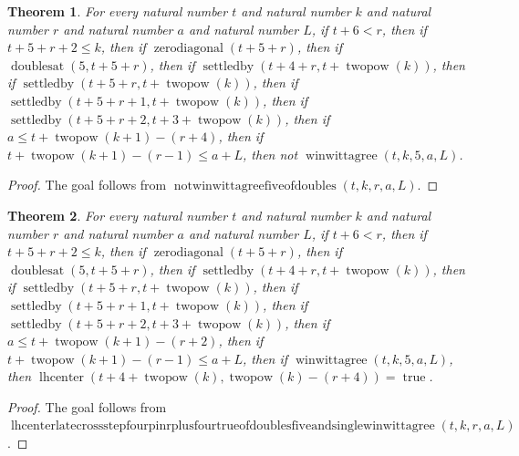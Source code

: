 \documentclass[11pt]{article}
\newtheorem{theorem}{Theorem}[section]
\theoremstyle{definition}
\begin{document}
\begin{theorem}
\label{ll:paper:not-winwittagree-five-of-doubles}
For every natural number \(t\) and natural number \(k\) and natural number \(r\) and natural number \(a\) and natural number \(L\), if \(t + 6 < r\), then if \(t + 5 + r + 2 \le k\), then if \(\operatorname{zerodiagonal}(t + 5 + r)\), then if \(\operatorname{doublesat}(5, t + 5 + r)\), then if \(\operatorname{settledby}(t + 4 + r, t + \operatorname{twopow}(k))\), then if \(\operatorname{settledby}(t + 5 + r, t + \operatorname{twopow}(k))\), then if \(\operatorname{settledby}(t + 5 + r + 1, t + \operatorname{twopow}(k))\), then if \(\operatorname{settledby}(t + 5 + r + 2, t + 3 + \operatorname{twopow}(k))\), then if \(a \le t + \operatorname{twopow}(k + 1) - (r + 4)\), then if \(t + \operatorname{twopow}(k + 1) - (r - 1) \le a + L\), then not \(\operatorname{winwittagree}(t, k, 5, a, L)\).
\end{theorem}
\begin{proof}
The goal follows from \(\operatorname{notwinwittagreefiveofdoubles}(t, k, r, a, L)\).
\end{proof}
\begin{theorem}
\label{ll:paper:lhcenter-late-cross-step-four-pin-r-plus-four-true-of-doubles-five-and-single-winwittagree}
For every natural number \(t\) and natural number \(k\) and natural number \(r\) and natural number \(a\) and natural number \(L\), if \(t + 6 < r\), then if \(t + 5 + r + 2 \le k\), then if \(\operatorname{zerodiagonal}(t + 5 + r)\), then if \(\operatorname{doublesat}(5, t + 5 + r)\), then if \(\operatorname{settledby}(t + 4 + r, t + \operatorname{twopow}(k))\), then if \(\operatorname{settledby}(t + 5 + r, t + \operatorname{twopow}(k))\), then if \(\operatorname{settledby}(t + 5 + r + 1, t + \operatorname{twopow}(k))\), then if \(\operatorname{settledby}(t + 5 + r + 2, t + 3 + \operatorname{twopow}(k))\), then if \(a \le t + \operatorname{twopow}(k + 1) - (r + 2)\), then if \(t + \operatorname{twopow}(k + 1) - (r - 1) \le a + L\), then if \(\operatorname{winwittagree}(t, k, 5, a, L)\), then \(\operatorname{lhcenter}(t + 4 + \operatorname{twopow}(k), \operatorname{twopow}(k) - (r + 4)) = \operatorname{true}\).
\end{theorem}
\begin{proof}
The goal follows from \(\operatorname{lhcenterlatecrossstepfourpinrplusfourtrueofdoublesfiveandsinglewinwittagree}(t, k, r, a, L)\).
\end{proof}
\end{document}
